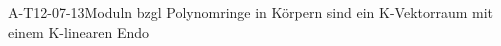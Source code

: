 
\begin{EXA}{A-T12-07-13}{Moduln bzgl Polynomringe in Körpern sind ein K-Vektorraum mit einem K-linearen Endo}
\end{EXA}
